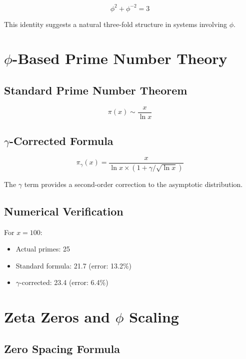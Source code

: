 \documentclass[12pt,a4paper]{article}
\begin{document}
\begin{equation}
\phi^2 + \phi^{-2} = 3
\end{equation}

This identity suggests a natural three-fold structure in systems involving $\phi$.

\section{$\phi$-Based Prime Number Theory}

\subsection{Standard Prime Number Theorem}

\begin{equation}
\pi(x) \sim \frac{x}{\ln x}
\end{equation}

\subsection{$\gamma$-Corrected Formula}

\begin{equation}
\pi_\gamma(x) = \frac{x}{\ln x \times (1 + \gamma/\sqrt{\ln x})}
\end{equation}

The $\gamma$ term provides a second-order correction to the asymptotic distribution.

\subsection{Numerical Verification}

For $x = 100$:
\begin{itemize}
\item Actual primes: 25
\item Standard formula: 21.7 (error: 13.2\%)
\item $\gamma$-corrected: 23.4 (error: 6.4\%)
\end{itemize}

\section{Zeta Zeros and $\phi$ Scaling}

\subsection{Zero Spacing Formula}
\end{document}
